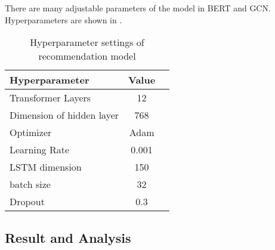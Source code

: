 There are many adjustable parameters of the model in BERT and GCN\@. Hyperparameters are shown in \tblname{\ref{tbl:ch2-hpsetting}}.
\begin{table}[htbp!]
    \caption{Hyperparameter settings of recommendation model}\label{tbl:ch2-hpsetting}
    \centering
    \begin{tabular}{l c c}
        \toprule
        Hyperparameter            & Value \\
        \midrule
        Transformer Layers        & 12    \\
        Dimension of hidden layer & 768   \\
        Optimizer                 & Adam  \\
        Learning Rate             & 0.001 \\
        LSTM dimension            & 150   \\
        batch size                & 32    \\
        Dropout                   & 0.3   \\
        \midrule
        \bottomrule
    \end{tabular}
\end{table}






\subsection{Result and Analysis}

